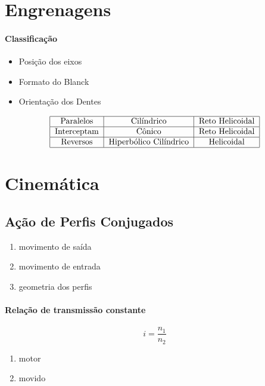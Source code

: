 \section{Engrenagens}
\paragraph{Classificação}
\begin{itemize}
\item Posição dos eixos
\item Formato do Blanck
\item Orientação dos Dentes
\end{itemize}

\[\begin{tabular}{|c|c|c|}
\hline 
Paralelos & Cilíndrico & Reto Helicoidal \\ 
\hline 
Interceptam & Cônico & Reto Helicoidal \\ 
\hline 
Reversos & Hiperbólico Cilíndrico & Helicoidal \\ 
\hline 
\end{tabular} \]

\section{Cinemática}
\subsection{Ação de Perfis Conjugados}
\begin{enumerate}
\item movimento de saída
\item movimento de entrada
\item geometria dos perfis
\end{enumerate}

\paragraph*{Relação de transmissão constante}
\[i=\frac{n_{1}}{n_{2}}\]
\begin{enumerate}
\item motor
\item movido
\end{enumerate}


